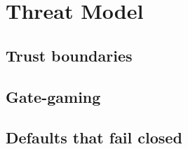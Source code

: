 \section{Threat Model}
\label{sec:threat}


\subsection{Trust boundaries}

\subsection{Gate-gaming}

\subsection{Defaults that fail closed}


